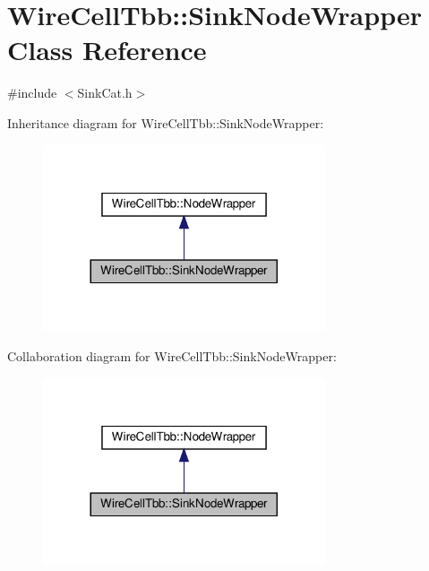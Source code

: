 \hypertarget{class_wire_cell_tbb_1_1_sink_node_wrapper}{}\section{Wire\+Cell\+Tbb\+:\+:Sink\+Node\+Wrapper Class Reference}
\label{class_wire_cell_tbb_1_1_sink_node_wrapper}


{\ttfamily \#include $<$Sink\+Cat.\+h$>$}



Inheritance diagram for Wire\+Cell\+Tbb\+:\+:Sink\+Node\+Wrapper\+:
\nopagebreak
\begin{figure}[H]
\begin{center}
\leavevmode
\includegraphics[width=236pt]{class_wire_cell_tbb_1_1_sink_node_wrapper__inherit__graph}
\end{center}
\end{figure}


Collaboration diagram for Wire\+Cell\+Tbb\+:\+:Sink\+Node\+Wrapper\+:
\nopagebreak
\begin{figure}[H]
\begin{center}
\leavevmode
\includegraphics[width=236pt]{class_wire_cell_tbb_1_1_sink_node_wrapper__coll__graph}
\end{center}
\end{figure}
